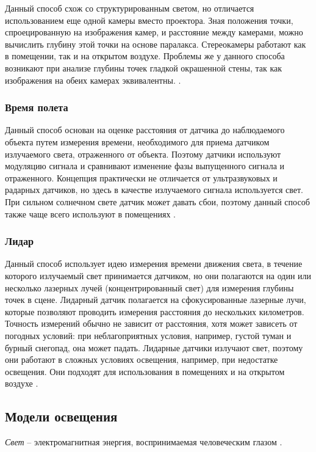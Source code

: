 Данный способ схож со структурированным светом, но отличается использованием еще одной камеры вместо проектора. Зная положения точки, спроецированную на изображения камер, и расстояние между камерами, можно вычислить глубину этой точки на основе паралакса. Стереокамеры работают как в помещении, так и на открытом воздухе. Проблемы же у данного способа возникают при анализе глубины точек гладкой окрашенной стены, так как изображения на обеих камерах эквивалентны. \cite{rgbd}.

\subsubsection*{Время полета}

Данный способ основан на оценке расстояния от датчика до наблюдаемого объекта путем измерения времени, необходимого для приема датчиком излучаемого света, отраженного от объекта. Поэтому датчики используют модуляцию сигнала и сравнивают изменение фазы выпущенного сигнала и отраженного. Концепция практически не отличается от ультразвуковых и радарных датчиков, но здесь в качестве излучаемого сигнала используется свет. При сильном солнечном свете датчик может давать сбои, поэтому данный способ также чаще всего используют в помещениях \cite{rgbd}.

\subsubsection*{Лидар}

Данный способ использует идею измерения времени движения света, в течение которого излучаемый свет принимается датчиком, но они полагаются на один или несколько лазерных лучей (концентрированный свет) для измерения глубины точек в сцене. Лидарный датчик полагается на сфокусированные лазерные лучи, которые позволяют проводить измерения расстояния до нескольких километров. Точность измерений обычно не зависит от расстояния, хотя может зависеть от погодных условий: при неблагоприятных условия, например, густой туман и бурный снегопад, она может падать. Лидарные датчики излучают свет, поэтому они работают в сложных условиях освещения, например, при недостатке освещения. Они подходят для использования в помещениях и на открытом воздухе \cite{rgbd}.

\subsection{Модели освещения}

\textit{Свет} -- электромагнитная энергия, воспринимаемая человеческим глазом \cite{big_rus_enc}.

